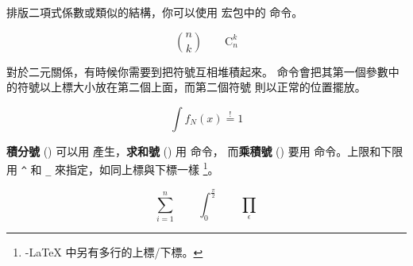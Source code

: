 
排版二項式係數或類似的結構，你可以使用  宏包中的  命令。
\begin{example}
\begin{displaymath}
\binom{n}{k}\qquad\mathrm{C}_n^k
\end{displaymath}
\end{example}


對於二元關係，有時候你需要到把符號互相堆積起來。  命令會把其第一個參數中的符號以上標大小放在第二個上面，而第二個符號
則以正常的位置擺放。

\begin{example}
\begin{displaymath}
\int f_N(x) \stackrel{!}{=} 1
\end{displaymath}
\end{example}


\textbf{積分號} () 可以用  產生，\textbf{求和號} () 用  命令， 而\textbf{乘積號} () 要用  命令。上限和下限用 \verb|^| 和 \verb|_| 來指定，如同上標與下標一樣
\footnote{\AmS-\LaTeX{} 中另有多行的上標/下標。}。


\begin{example}
\begin{displaymath}
\sum_{i=1}^{n} \qquad
\int_{0}^{\frac{\pi}{2}} \qquad
\prod_\epsilon
\end{displaymath}
\end{example}


